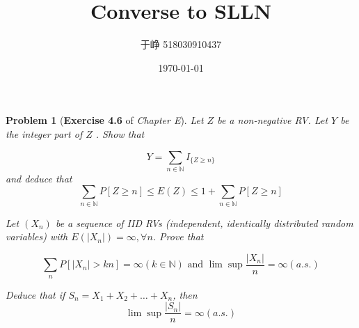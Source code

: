 \documentclass[UTF8, 12pt]{article}
\title{Converse to SLLN}
\author{于峥 518030910437}
\date{\today}
\theoremstyle{break}
\newtheorem{problem}{Problem}
\begin{document}
    \maketitle
    
    \begin{problem}[\textbf{Exercise 4.6} of \textit{Chapter E}]
        
        Let $Z$ be a non-negative RV. Let $Y$ be the integer part of $Z$ . Show that
        
        $$
        Y = \sum_{n\in \mathbb{N}} I_{\{Z\geq n\}}
        $$
        and deduce that
        $$
        \sum_{n\in \mathbb{N}}P[Z\geq n]\leq E(Z) \leq 1 + \sum_{n\in\mathbb{N}}P[Z\geq n]
        $$

        Let $(X_n)$ be a sequence of IID RVs (independent, identically distributed random variables) with
        $E(|X_n|)=\infty, \forall n$. Prove that

        $$
        \sum_n P[|X_n|>kn] = \infty (k \in \mathbb{N}) \text{     and     } 
        \lim \sup \frac {|X_n|} n = \infty (a.s.)
        $$

        Deduce that if $S_n = X_1 + X_2 + \dots + X_n$, then
        $$
        \lim \sup \frac {|S_n|} n = \infty (a.s.)
        $$
    \end{problem}
\end{document}
